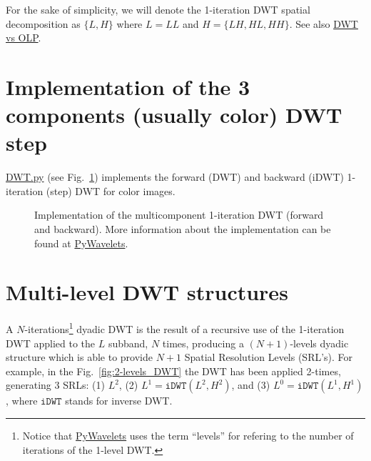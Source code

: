 For the sake of simplicity, we will denote the 1-iteration DWT spatial
decomposition as $\{L, H\}$ where $L=LL$ and $H=\{LH, HL, HH\}$. See
also
\href{https://nbviewer.jupyter.org/github/Sistemas-Multimedia/PRMC/blob/master/docs/DWT_vs_LPT.ipynb}{DWT
  vs OLP}.


\section*{Implementation of the 3 components (usually color) DWT step}

\href{https://github.com/Sistemas-Multimedia/PRMC/blob/master/src/DWT.py}{DWT.py}
(see Fig.~\ref{fig:DWT}) implements the forward (DWT) and backward
(iDWT) 1-iteration (step) DWT for color images.

\begin{figure}
  
  \caption{Implementation of the multicomponent 1-iteration DWT
    (forward and backward). More information about the implementation
    can be found at
    \href{https://pywavelets.readthedocs.io/en/latest/index.html}{PyWavelets}.}
  \label{fig:DWT}
\end{figure}


\section{Multi-level DWT structures}

A $N$-iterations\footnote{Notice that
  \href{https://pywavelets.readthedocs.io/en/latest/index.html}{PyWavelets}
  uses the term ``levels'' for refering to the number of iterations of
  the 1-level DWT.} dyadic DWT is the result of a recursive use of the
1-iteration DWT applied to the $L$ subband, $N$ times, producing a
$(N+1)$-levels dyadic structure which is able to provide $N+1$ Spatial
Resolution Levels (SRL's). For example, in the
Fig.~\ref{fig:2-levels_DWT} the DWT has been applied 2-times,
generating 3 SRLs: (1) $L^2$, (2) $L^1=\mathtt{iDWT}(L^2, H^2)$, and
(3) $L^0=\mathtt{iDWT}(L^1, H^1)$, where $\mathtt{iDWT}$ stands for
inverse DWT.

